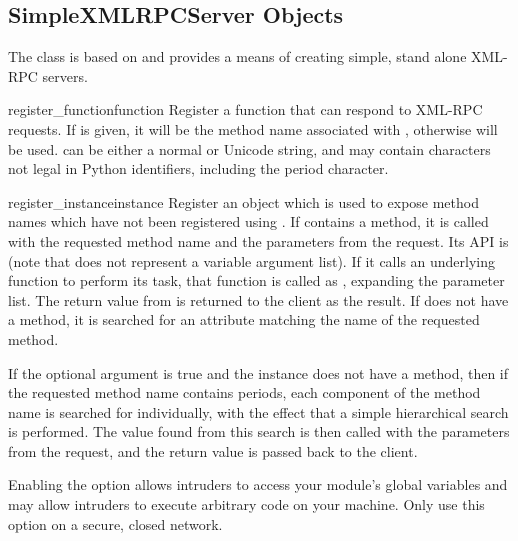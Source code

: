 \subsection{SimpleXMLRPCServer Objects \label{simple-xmlrpc-servers}}

The  class is based on
 and provides a means of creating
simple, stand alone XML-RPC servers.

\begin{methoddesc}[SimpleXMLRPCServer]{register_function}{function}
  Register a function that can respond to XML-RPC requests.  If
   is given, it will be the method name associated with
  , otherwise  will be
  used.   can be either a normal or Unicode string, and may
  contain characters not legal in Python identifiers, including the
  period character.
\end{methoddesc}

\begin{methoddesc}[SimpleXMLRPCServer]{register_instance}{instance}
  Register an object which is used to expose method names which have
  not been registered using .  If
   contains a  method, it is called
  with the requested method name and the parameters from the request.  Its
  API is  (note that
   does not represent a variable argument list).  If it calls an
  underlying function to perform its task, that function is called as
  , expanding the parameter list.
  The return value from  is returned to the client as
  the result.  If
   does not have a  method, it is
  searched for an attribute matching the name of the requested method.

  If the optional  argument is true and the
  instance does not have a  method, then
  if the requested method name contains periods, each component of the
  method name is searched for individually, with the effect that a
  simple hierarchical search is performed.  The value found from this
  search is then called with the parameters from the request, and the
  return value is passed back to the client.

  \begin{notice}[warning]
  Enabling the  option allows intruders to access
  your module's global variables and may allow intruders to execute
  arbitrary code on your machine.  Only use this option on a secure,
  closed network.
  \end{notice}


\end{methoddesc}

